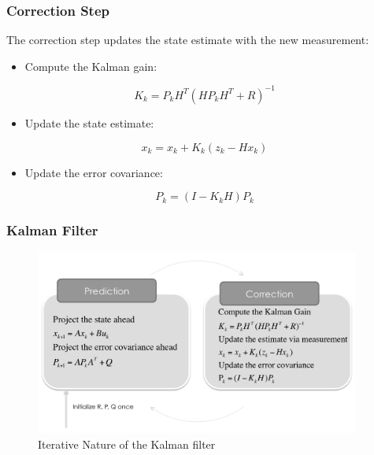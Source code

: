\documentclass{beamer}
\begin{document}
\begin{frame}
    \frametitle{Correction Step}
    The correction step updates the state estimate with the new measurement:
    \begin{itemize}
        \item Compute the Kalman gain:
    \end{itemize}
    \[K_{k} = P_{k}H^{T}(HP_{k}H^{T}+R)^{-1}\]
    \begin{itemize}
        \item Update the state estimate:
    \end{itemize}
    \[x_{k} = x_{k}+K_{k}(z_{k}-Hx_{k})\]
    \begin{itemize}
        \item Update the error covariance:
    \end{itemize}
    \[P_{k} = (I-K_{k}H)P_{k}\]
\end{frame}

\begin{frame}
    \frametitle{Kalman Filter}
    \begin{figure}
        \centering
        \includegraphics[width=0.95\textwidth]{images/06_kalman_diagram.png}
        \caption{Iterative Nature of the Kalman filter}
    \end{figure}
\end{frame}
\end{document}
